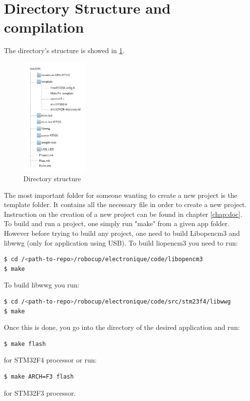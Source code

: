 \documentclass[12pt,a4paper]{report}
\begin{document}
\section{Directory Structure and compilation}
The directory's structure is showed in \ref{fig:dir}.

\begin{figure}
  \vspace{-20pt}
  \centering
  \includegraphics[width=0.30\textwidth]{figs/tree.pdf}
  \vspace{-10pt}
  \caption{Directory structure}
  \vspace{-40pt}
  \label{fig:dir}
\end{figure}
The most important folder for someone wanting to create a new project is the template folder. It contains all the necessary file in order to create a new project. Instruction on the creation of a new project can be found in chapter \ref{chap:doc}.
To build and run a project, one simply run "make" from a given app folder. However before trying to build any project, one need to build Libopencm3 and libwwg (only for application using USB). To build liopencm3 you need to run:

\begin{lstlisting}[language=bash]
$ cd /<path-to-repo>/robocup/electronique/code/libopencm3
$ make
\end{lstlisting}
To build libwwg you run: 
\begin{lstlisting}[language=bash]
$ cd /<path-to-repo>/robocup/electronique/code/src/stm23f4/libwwg
$ make
\end{lstlisting}
Once this is done, you go into the directory of the desired application and run:
\begin{lstlisting}[language=bash, label=code:f4]
$ make flash
\end{lstlisting}
for STM32F4 processor or run:
\begin{lstlisting}[language=bash, label=code:f3]
$ make ARCH=F3 flash
\end{lstlisting}
for STM32F3 processor.
\end{document}
